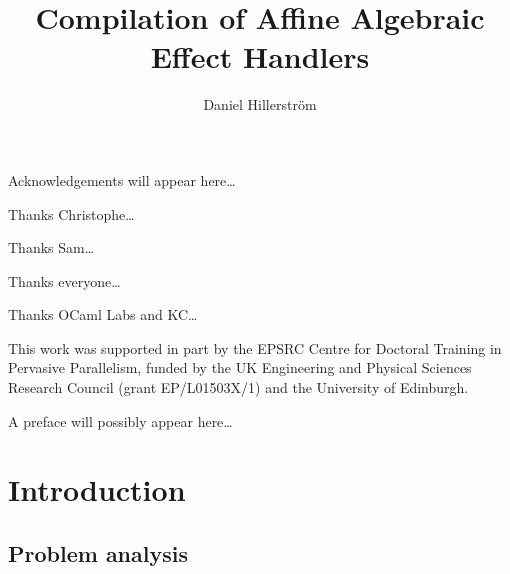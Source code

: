 \documentclass[mscres,icsa,lfcs,twoside,openright,logo,rightchapter,normalheadings]{infthesis}
\title{Compilation of Affine Algebraic Effect Handlers}
\author{Daniel Hillerström}
\theoremstyle{definition}
\begin{document}
\raggedbottom
\begin{preliminary}

\maketitle

\begin{acknowledgements}
Acknowledgements will appear here\dots

Thanks Christophe\dots

Thanks Sam\dots

Thanks everyone\dots

Thanks OCaml Labs and KC\dots

This work was supported in part by the EPSRC Centre for Doctoral Training in Pervasive Parallelism, funded by the UK Engineering and Physical Sciences Research Council (grant EP/L01503X/1) and the University of Edinburgh.
\end{acknowledgements}

\standarddeclaration


\begin{preface}
A preface will possibly appear here\dots
\end{preface}

\setcounter{secnumdepth}{2} %
\setcounter{tocdepth}{3} %
\tableofcontents

\end{preliminary}


\chapter{Introduction}
\section{Problem analysis}
\end{document}
